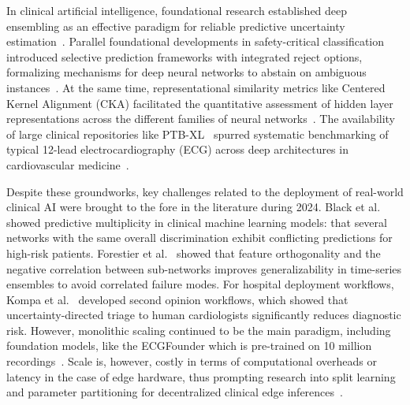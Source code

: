 \documentclass{ICIC2026}
\begin{document}
In clinical artificial intelligence, foundational research established deep ensembling as an effective paradigm for reliable predictive uncertainty estimation~\cite{lakshminarayanan2017simple}. Parallel foundational developments in safety-critical classification introduced selective prediction frameworks with integrated reject options, formalizing mechanisms for deep neural networks to abstain on ambiguous instances~\cite{geifman2019selectivenet}. At the same time, representational similarity metrics like Centered Kernel Alignment (CKA) facilitated the quantitative assessment of hidden layer representations across the different families of neural networks~\cite{kornblith2019similarity}. The availability of large clinical repositories like PTB-XL~\cite{wagner2020ptbxl} spurred systematic benchmarking of typical 12-lead electrocardiography (ECG) across deep architectures in cardiovascular medicine~\cite{strodthoff2021deep}.

Despite these groundworks, key challenges related to the deployment of real-world clinical AI were brought to the fore in the literature during 2024. Black et al.~\cite{black2024multiplicity} showed predictive multiplicity in clinical machine learning models: that several networks with the same overall discrimination exhibit conflicting predictions for high-risk patients. Forestier et al.~\cite{forestier2024ortho} showed that feature orthogonality and the negative correlation between sub-networks improves generalizability in time-series ensembles to avoid correlated failure modes. For hospital deployment workflows, Kompa et al.~\cite{kompa2024second} developed second opinion workflows, which showed that uncertainty-directed triage to human cardiologists significantly reduces diagnostic risk. However, monolithic scaling continued to be the main paradigm, including foundation models, like the ECGFounder which is pre-trained on 10 million recordings~\cite{li2024ecgfounder}. Scale is, however, costly in terms of computational overheads or latency in the case of edge hardware, thus prompting research into split learning and parameter partitioning for decentralized clinical edge inferences~\cite{zhang2024split}.
\end{document}
